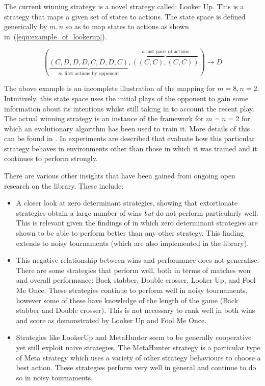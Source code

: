 \documentclass{article}
\begin{document}
The current winning strategy is a novel strategy called: Looker Up. This is a
strategy that maps a given set of states to actions. The state space is defined
generically by \(m, n\) so as to map states to actions as shown
in~(\ref{equ:example_of_lookerup}).

\begin{equation}
	(\underbrace{(C, D, D, D, C, D, D, C)}_{m\text{ first actions by opponent}},
	\overbrace{((C, C), (C, C))}^{n\text{ last pairs of actions}}) \to D
	\label{equ:example_of_lookerup}
\end{equation}

The above example is an incomplete illustration of the mapping for \(m=8,
n=2\). Intuitively, this state space uses the initial plays of the opponent to
gain some information about its intentions whilst still taking in to account
the recent play. The actual winning strategy is an instance of the framework
for \(m=n=2\) for which an evolutionary algorithm has been used to train it.
More details of this can be found in \cite{Jones2015}. In \cite{Knight2015}
experiments are described that evaluate how this particular strategy behaves in
environments other than those in which it was trained and it continues to
perform strongly.

There are various other insights that have been gained from ongoing open
research on the library. These include:

\begin{itemize}
    \item A closer look at zero determinant strategies, showing that
        extortionate strategies obtain a large number of wins \textit{but} do
        not perform particularly well. This is relevant given the findings of
        \cite{Stewart2012} in which zero determinant strategies are shown to be
        able to perform better than any other strategy. This finding extends
        to noisy tournaments (which are also implemented in the library).
    \item This negative relationship between wins and performance does not
        generalise. There are some strategies that perform well, both in terms
        of matches won and overall performance: Back stabber, Double crosser,
        Looker Up, and Fool Me Once. These strategies continue to perform well in noisy
        tournaments, however some of these have knowledge of the length of the
        game (Back stabber and Double crosser). This is not necessary to rank
        well in both wins and score as demonstrated by Looker Up and Fool Me
        Once.
    \item Strategies like LookerUp and MetaHunter seem to be generally
        cooperative yet still exploit naive strategies. The MetaHunter strategy
        is a particular type of Meta strategy which uses a variety of other
        strategy behaviours to choose a best action. These strategies perform
        very well in general and continue to do so in noisy tournaments.
\end{itemize}
\end{document}
